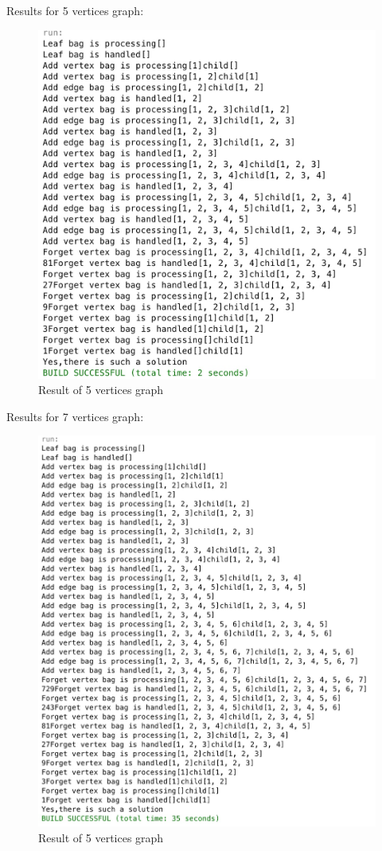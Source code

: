 Results for 5 vertices graph:
\begin{figure}[H] 
  \centering
  \includegraphics[width=.8\textwidth]{a11.png}
  \caption{Result of 5 vertices graph}
\end{figure}
Results for 7 vertices graph:
\begin{figure}[H] 
  \centering
  \includegraphics[width=.8\textwidth]{a12.png}
  \caption{Result of 5 vertices graph}
\end{figure}
